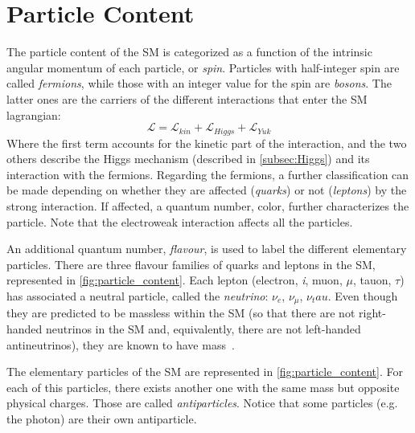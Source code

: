 \section{Particle Content}
\label{subsec:Particles}
The particle content of the SM is categorized as a function of the intrinsic angular momentum of each particle, or \textit{spin}. Particles with half-integer spin are called \textit{fermions}, while those with an integer value for the spin are \textit{bosons}. The latter ones are the carriers of the different interactions that enter the SM lagrangian:
\begin{equation}
\mathcal{L} = \mathcal{L}_{kin} + \mathcal{L}_{Higgs} + \mathcal{L}_{Yuk}
\end{equation}
Where the first term accounts for the kinetic part of the interaction, and the two others describe the Higgs mechanism (described in \ref{subsec:Higgs}) and its interaction with the fermions. 
Regarding the fermions, a further classification can be made depending on whether they are affected (\textit{quarks}) or not (\textit{leptons}) by the strong interaction. If affected, a quantum number, color, further characterizes the particle. Note that the electroweak interaction affects all the particles. 

An additional quantum number, \textit{flavour}, is used to label the different elementary particles. There are three flavour families of quarks and leptons in the SM, represented in \ref{fig:particle_content}. Each lepton (electron, \textit{i}, muon, $\mu$, tauon, $\tau$) has associated a neutral particle,  called the \textit{neutrino}: $\nu_e$, $\nu_\mu$, $\nu_tau$. Even though they are predicted to be massless within the SM (so that there are not right-handed neutrinos in the SM and, equivalently, there are not left-handed antineutrinos), they are known to have mass~\cite{SolarNeutrinos}.

The elementary particles of the SM are represented in \ref{fig:particle_content}. For each of this particles, there exists another one with the same mass but opposite physical charges. Those are called \textit{antiparticles}. Notice that some particles (e.g. the photon) are their own antiparticle. 

